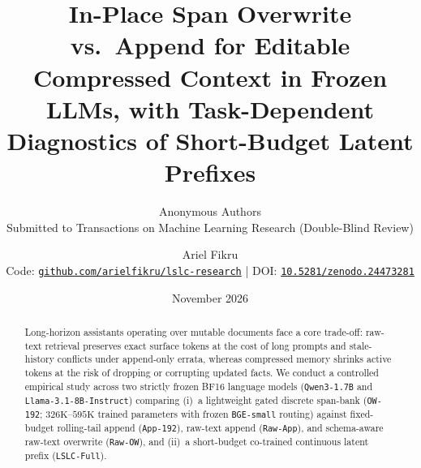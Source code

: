 \documentclass[11pt]{article}
\title{\textbf{In-Place Span Overwrite vs.\ Append for Editable Compressed Context in Frozen LLMs, with Task-Dependent Diagnostics of Short-Budget Latent Prefixes}}
\author{Anonymous Authors\\{\small Submitted to Transactions on Machine Learning Research (Double-Blind Review)}}
\date{}
\author{
  Ariel Fikru\\[4pt]
  {\small Code: \href{https://github.com/arielfikru/lslc-research}{\texttt{github.com/arielfikru/lslc-research}} \;\;|\;\; DOI: \href{https://doi.org/10.5281/zenodo.24473281}{\texttt{10.5281/zenodo.24473281}}}
}
\date{\vspace{-0.6em}November 2026}
\newif\ifanonymous
\renewcommand{\_}{\origunderscore\allowbreak}
\begin{document}
\maketitle
\ifanonymous\vspace{-1.8em}\else\vspace{-2.6em}\fi

\ifanonymous\else
{\renewcommand{\thefootnote}{}}
\fi

\begin{abstract}
Long-horizon assistants operating over mutable documents face a core trade-off: raw-text retrieval preserves exact surface tokens at the cost of long prompts and stale-history conflicts under append-only errata, whereas compressed memory shrinks active tokens at the risk of dropping or corrupting updated facts. We conduct a controlled empirical study across two strictly frozen BF16 language models (\texttt{Qwen3-1.7B} and \texttt{Llama-3.1-8B-Instruct}) comparing (i)~a lightweight gated discrete span-bank (\texttt{OW-192}; $326\text{K}$--$595\text{K}$ trained parameters with frozen \texttt{BGE-small} routing) against fixed-budget rolling-tail append (\texttt{App-192}), raw-text append (\texttt{Raw-App}), and schema-aware raw-text overwrite (\texttt{Raw-OW}), and (ii)~a short-budget co-trained continuous latent prefix (\texttt{LSLC-Full}).


\end{abstract}
\end{document}
